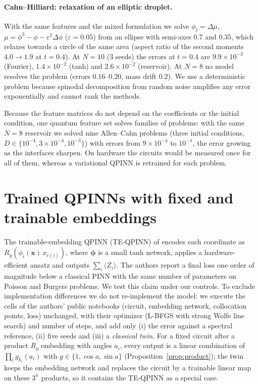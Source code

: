 \documentclass[11pt]{article}
\theoremstyle{remark}\newtheorem*{remark}{Remark}
\begin{document}
\paragraph{Cahn--Hilliard: relaxation of an elliptic droplet.} With the same features and the mixed formulation we solve
$\phi_t=\Delta\mu$, $\mu=\phi^3-\phi-\varepsilon^2\Delta\phi$ ($\varepsilon=0.05$) from an ellipse with semi-axes $0.7$
and $0.35$, which relaxes towards a circle of the same area (aspect ratio of the second moments $4.0\to1.9$ at $t=0.4$).
At $N=10$ (3 seeds) the errors at $t=0.4$ are $9.9\times10^{-3}$ (Fourier), $1.4\times10^{-2}$ (tanh) and
$2.6\times10^{-2}$ (reservoir). At $N=8$ no model resolves the problem (errors $0.16$--$0.20$, mass drift $0.2$).
We use a deterministic problem because spinodal decomposition from random noise amplifies any error exponentially and
cannot rank the methods.

Because the feature matrices do not depend on the coefficients or the initial condition, one quantum feature set
solves families of problems: with the same $N=8$ reservoir we solved nine Allen--Cahn problems (three initial conditions,
$D\in\{10^{-4},3\times10^{-4},10^{-3}\}$) with errors from $9\times10^{-4}$ to $10^{-1}$, the error growing as the
interfaces sharpen. On hardware the circuits would be measured once for all of them, whereas a variational QPINN is
retrained for each problem.

\section{Trained QPINNs with fixed and trainable embeddings}\label{sec:embed}
The trainable-embedding QPINN (TE-QPINN) of \citet{berger2025teqpinn} encodes each coordinate as
$R_y(\phi_i(\bm x)\,x_{c(i)})$, where $\bm\phi$ is a small tanh network, applies a hardware-efficient ansatz and
outputs $\sum_i\langle Z_i\rangle$. The authors report a final loss one order of magnitude below a classical PINN with
the same number of parameters on Poisson and Burgers problems. We test this claim under our controls.
To exclude implementation differences we do not re-implement the model: we execute the cells of the authors' public
notebooks (circuit, embedding network, collocation points, loss) unchanged, with their optimizer (L-BFGS with strong
Wolfe line search) and number of steps, and add only (i) the error against a spectral reference, (ii) five seeds and
(iii) a \emph{classical twin}. For a fixed circuit after a product $R_y$ embedding with angles $a_i$, every output is a
linear combination of $\prod_i g_{k_i}(a_i)$ with $g\in\{1,\cos a,\sin a\}$ (Proposition~\ref{prop:product}); the twin
keeps the embedding network and replaces the circuit by a trainable linear map on these $3^n$ products, so it contains
the TE-QPINN as a special case.
\end{document}
